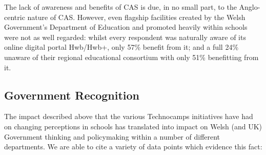 \documentclass{sig-alternate}
\begin{document}
The lack of awareness and benefits of CAS is due, in no small part,
to the Anglo-centric nature of CAS.
However, even flagship facilities created by the Welsh Government's
Department of Education and promoted heavily within schools
were not as well regarded: whilst every respondent was naturally
aware of its online digital portal Hwb/Hwb+, only 57\% benefit from it;
and a full 24\% unaware of their regional educational consortium
with only 51\% benefitting from it.

\subsection{Government Recognition}\label{govrecog}

The impact described above that the various Technocamps initiatives
have had on changing perceptions in schools has translated into impact
on Welsh (and UK) Government thinking and policymaking within a number
of different departments. We are able to cite a variety of data points
which evidence this fact:
\end{document}
